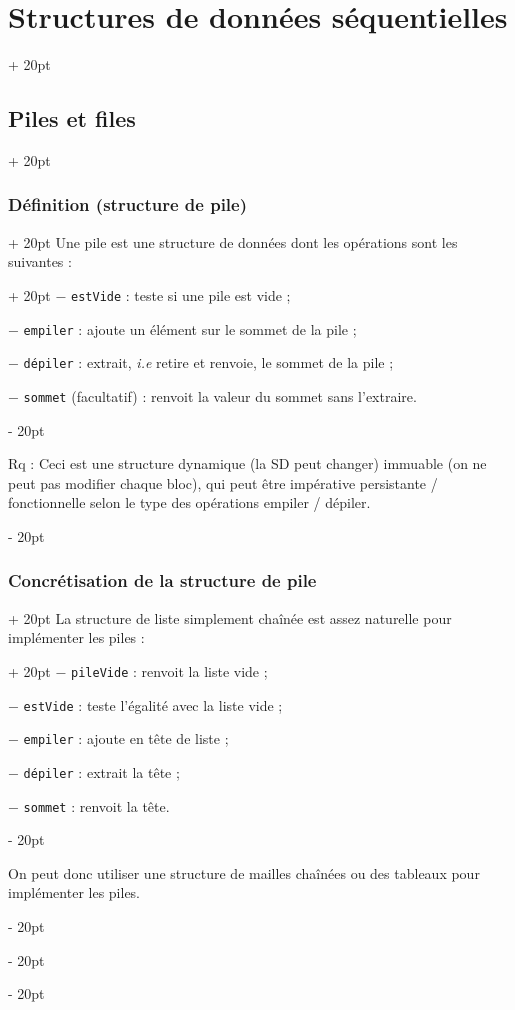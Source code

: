 \documentclass[a4paper, 12pt, twoside]{article}
\newcommand{\ind}[1][20pt]{\advance\leftskip + #1}
\newcommand{\deind}[1][20pt]{\advance\leftskip - #1}
\newenvironment{indt}[2][20pt]{#2 \par \ind[#1]}{\par \deind} %
\begin{document}
\begin{indt}{\section{Structures de données séquentielles}}
\begin{indt}{\subsection{Piles et files}}
\begin{indt}{\subsubsection{Définition (structure de pile)}}
\begin{indt}{Une pile est une structure de données dont les opérations sont les suivantes :}
                    $-$ \texttt{estVide} : teste si une pile est vide ;
                    
                    $-$ \texttt{empiler} : ajoute un élément sur le sommet de la pile ;
                    
                    $-$ \texttt{dépiler} : extrait, \textit{i.e} retire et renvoie, le sommet de la pile ;
                    
                    $-$ \texttt{sommet} (facultatif) : renvoit la valeur du sommet sans l'extraire.
                \end{indt}
                
                \vspace{6pt}
                
                Rq : Ceci est une structure dynamique (la SD peut changer) immuable (on ne peut pas modifier chaque bloc), qui peut être impérative persistante / fonctionnelle selon le type des opérations empiler / dépiler.
            \end{indt}
            
            \vspace{6pt}
            
            \begin{indt}{\subsubsection{Concrétisation de la structure de pile}}
                \begin{indt}{La structure de liste simplement chaînée est assez naturelle pour implémenter les piles :}
                    $-$ \texttt{pileVide} : renvoit la liste vide ;
                    
                    $-$ \texttt{estVide} : teste l'égalité avec la liste vide ;
                    
                    $-$ \texttt{empiler} : ajoute en tête de liste ;
                    
                    $-$ \texttt{dépiler} : extrait la tête ;
                    
                    $-$ \texttt{sommet} : renvoit la tête.
                \end{indt}
                
                \vspace{6pt}
                
                On peut donc utiliser une structure de mailles chaînées ou des tableaux pour implémenter les piles.
                

\end{indt}
\end{indt}
\end{indt}
\end{document}
